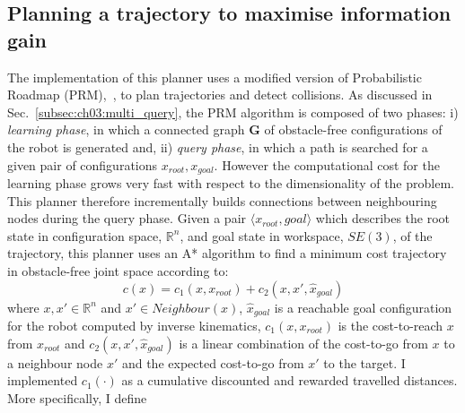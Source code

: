 \subsection{Planning a trajectory to maximise information gain}\label{sec:ch06:heuristic}

The implementation of this planner uses a modified version of Probabilistic Roadmap (PRM),~\citep{bib:kavraki_1996}, to plan trajectories and detect collisions. As discussed in Sec.~\ref{subsec:ch03:multi_query}, the PRM algorithm is composed of two phases: i) \emph{learning phase}, in which a connected graph $\mathbf{G}$ of obstacle-free configurations of the robot is generated and, ii) \emph{query phase}, in which a path is searched for a given pair of configurations $x_{root},x_{goal}$. However the computational cost for the learning phase grows very fast with respect to the dimensionality of the problem. This planner therefore incrementally builds connections between neighbouring nodes during the query phase. 
Given a pair $\langle x_{root}, goal\rangle$ which describes the root state in configuration space, $\mathbb{R}^n$, and goal state in workspace, $SE(3)$, of the trajectory, this planner uses an A* algorithm to find a minimum cost trajectory in obstacle-free joint space according to:
\begin{equation}
c(x) = c_1(x,x_{root}) + c_2(x,x',\hat{x}_{goal})
\end{equation} 
where $x,x'\in\mathbb{R}^n$ and $x'\in Neighbour(x)$, $\hat{x}_{goal}$ is a reachable goal configuration for the robot computed by inverse kinematics, $c_1(x,x_{root})$ is the cost-to-reach $x$ from $x_{root}$ and $c_2(x,x',\hat{x}_{goal})$ is a linear combination of the cost-to-go from $x$ to a neighbour node $x'$ and the expected cost-to-go from $x'$ to the target. I implemented $c_1(\cdot)$ as a cumulative discounted and rewarded travelled distances. More specifically, I define 
